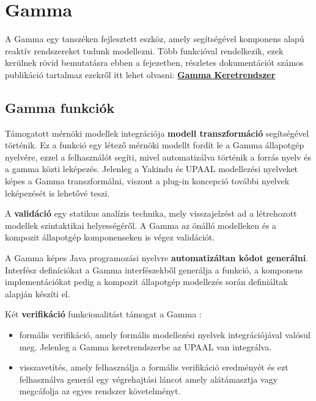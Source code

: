 \section{Gamma}

A Gamma egy tanszéken fejlesztett eszköz, amely segítségével komponens alapú reaktív rendszereket tudunk modellezni. Több funkcióval rendelkezik, ezek kerülnek rövid bemutatásra ebben a fejezetben, részletes dokumentációt számos publikáció tartalmaz ezekről itt lehet olvasni: \textbf{\href{https://inf.mit.bme.hu/node/6028}{Gamma Keretrendszer}}
\subsection{Gamma funkciók}
Támogatott mérnöki modellek integrációja \textbf{modell transzformáció}  segítségével történik. Ez a funkció egy létező mérnöki modellt fordít le a Gamma állapotgép nyelvére, ezzel a felhasználót segíti, mivel automatizálva történik a forrás nyelv és a gamma közti leképezés. Jelenleg a Yakindu és UPAAL modellezési nyelveket képes a Gamma transzformálni, viszont a plug-in koncepció további nyelvek leképezését is lehetővé teszi.

A \textbf{validáció} egy statikus analízis technika, mely visszajelzést ad a létrehozott modellek szintaktikai helyességéről. A Gamma az önálló modelleken és a kompozit állapotgép komponenseken is végez validációt.

A Gamma képes Java programozási nyelvre \textbf{automatizáltan kódot generálni}. Interfész definíciókat a Gamma interfészekből generálja a funkció, a komponens implementációkat pedig a kompozit állapotgép modellezés során definiáltak alapján készíti el.

Két \textbf{verifikáció} funkcionalitást támogat a Gamma :
\begin{itemize}
	\item formális verifikáció, amely formális modellezési nyelvek integrációjával valósul meg. Jelenleg a Gamma keretrendszerbe az UPAAL van integrálva.
	\item visszavetítés, amely felhasználja a formális verifikáció eredményét és ezt felhasználva  generál egy végrehajtási láncot amely alátámasztja vagy megcáfolja az egyes rendszer követelményt.
\end{itemize}

